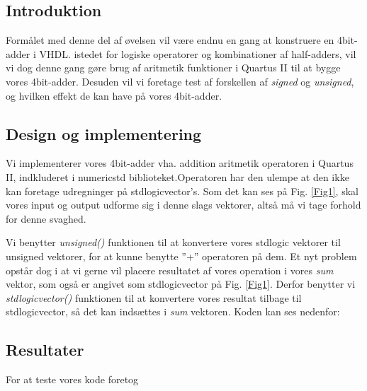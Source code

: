 \documentclass[../journal2.tex]{subfiles}
\begin{document}
\subsection{Introduktion}
Formålet med denne del af øvelsen vil være endnu en gang at konstruere en 4bit-adder i VHDL. istedet for logiske operatorer og kombinationer af half-adders, vil vi dog denne gang gøre brug af aritmetik funktioner i Quartus II til at bygge vores 4bit-adder. Desuden vil vi foretage test af forskellen af \textit{signed} og \textit{unsigned}, og hvilken effekt de kan have på vores 4bit-adder.

\subsection{Design og implementering}
Vi implementerer vores 4bit-adder vha. addition aritmetik operatoren i Quartus II, indkluderet i numeric\textunderscore std biblioteket.Operatoren har den ulempe at den ikke kan foretage udregninger på std\textunderscore logic\textunderscore vector's. Som det kan ses på Fig. \ref{Fig1}, skal vores input og output udforme sig i denne slags vektorer, altså må vi tage forhold for denne svaghed.


Vi benytter \textit{unsigned()} funktionen til at konvertere vores std\textunderscore logic vektorer til unsigned vektorer, for at kunne benytte ''+'' operatoren på dem. Et nyt problem opstår dog i at vi gerne vil placere resultatet af vores operation i vores \textit{sum} vektor, som også er angivet som std\textunderscore logic\textunderscore vector på Fig. \ref{Fig1}. Derfor benytter vi \textit{std\textunderscore logic\textunderscore vector()} funktionen til at konvertere vores resultat tilbage til std\textunderscore logic\textunderscore vector, så det kan indsættes i \textit{sum} vektoren. Koden kan ses nedenfor:


\subsection{Resultater}
For at teste vores kode foretog 
\end{document}
